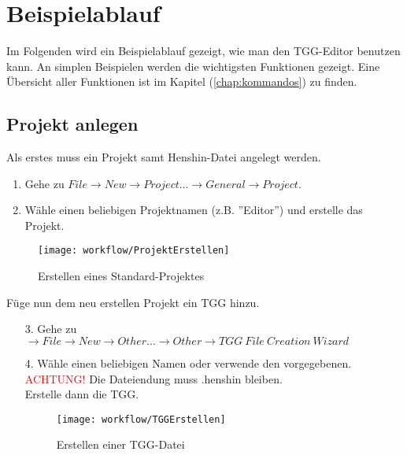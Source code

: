 \chapter{Beispielablauf}\label{chap:Workflow}

Im Folgenden wird ein Beispielablauf gezeigt, wie man den TGG-Editor benutzen kann. An simplen Beispielen werden die wichtigsten Funktionen gezeigt. 
Eine Übersicht aller Funktionen ist im Kapitel (\ref{chap:kommandos}) zu finden.

	\section{Projekt anlegen}
	Als erstes muss ein Projekt samt Henshin-Datei angelegt werden.

		\begin{enumerate}
			\item Gehe zu $File \rightarrow New \rightarrow Project... \rightarrow General \rightarrow Project$.
			\item Wähle einen beliebigen Projektnamen (z.B. ''Editor'') und erstelle das Projekt.
		\end{enumerate}
		
		\begin{figure}[h!] %
			\centering
			\texttt{[image: workflow/ProjektErstellen]}
			\caption{Erstellen eines Standard-Projektes}
			\label{fig:projektErstellen}
		\end{figure}		
		
		Füge nun dem neu erstellen Projekt ein TGG hinzu.
        \begin{enumerate}

			\item[3.] Gehe zu $\rightarrow File \rightarrow New \rightarrow Other... \rightarrow Other \rightarrow TGG\ 			File\ Creation\ Wizard$ 

			\item[4.] Wähle einen beliebigen Namen oder verwende den vorgegebenen. \\ \textcolor{red}		
			{ACHTUNG!} Die Dateiendung muss .henshin bleiben. \\
			Erstelle dann die TGG.
			
			\begin{figure}[h!] %
			\centering
			\texttt{[image: workflow/TGGErstellen]}
			\caption{Erstellen einer TGG-Datei}
			\label{fig:tggErstellen}
		\end{figure}
		\end{enumerate}

